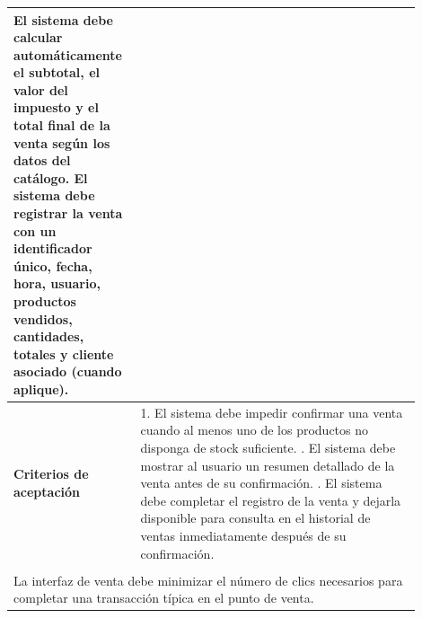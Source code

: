 \begin{longtable}{|p{0.25\linewidth}|p{0.15\linewidth}|p{0.15\linewidth}|p{0.35\linewidth}|}
{		El sistema debe calcular automáticamente el subtotal, el valor del impuesto y el total final de la venta según los datos del catálogo. \newline
		El sistema debe registrar la venta con un identificador único, fecha, hora, usuario, productos vendidos, cantidades, totales y cliente asociado (cuando aplique).}                                                           \\ \hline
		\cellcolor{tableheaderblue}\textbf{Criterios de aceptación} & \multicolumn{3}{p{0.70\linewidth}|}{                                                                                                                           %
			1. El sistema debe impedir confirmar una venta cuando al menos uno de los productos no disponga de stock suficiente. \newline
			2. El sistema debe mostrar al usuario un resumen detallado de la venta antes de su confirmación. \newline
		3. El sistema debe completar el registro de la venta y dejarla disponible para consulta en el historial de ventas inmediatamente después de su confirmación.}                                                                \\ \hline
		\rowcolor{tableheaderblue}
		\multicolumn{4}{|l|}{\textbf{Restricciones}}                                                                                                                                                                                 \\ \hline
		\multicolumn{4}{|p{0.96\linewidth}|}{%
		La interfaz de venta debe minimizar el número de clics necesarios para completar una transacción típica en el punto de venta.}                                                                                               \\ \hline
	
\end{longtable}
\endgroup


